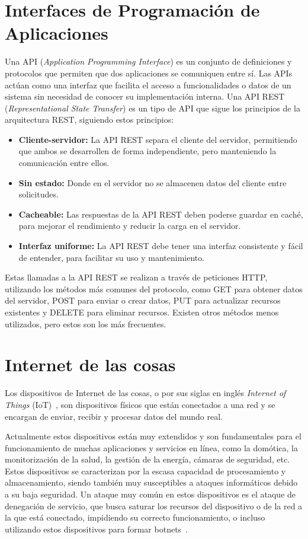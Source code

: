 \section{Interfaces de Programación de Aplicaciones}
Una API (\textit{Application Programming Interface}) es un conjunto de definiciones y protocolos que permiten que dos aplicaciones se comuniquen entre sí. Las APIs~\cite{Api} actúan como una interfaz que facilita el acceso a funcionalidades o datos de un sistema sin necesidad de conocer su implementación interna.
Una API REST (\textit{Representational State Transfer}) es un tipo de API que sigue los principios de la arquitectura REST, siguiendo estos principios:
\begin{itemize}
	\item \textbf{Cliente-servidor:} La API REST separa el cliente del servidor, permitiendo que ambos se desarrollen de forma independiente, pero manteniendo la comunicación entre ellos.
	\item \textbf{Sin estado:} Donde en el servidor no se almacenen datos del cliente entre solicitudes.
	\item \textbf{Cacheable:} Las respuestas de la API REST deben poderse guardar en caché, para mejorar el rendimiento y reducir la carga en el servidor.
	\item \textbf{Interfaz uniforme:} La API REST debe tener una interfaz consistente y fácil de entender, para facilitar su uso y mantenimiento.
\end{itemize}
Estas llamadas a la API REST se realizan a través de peticiones HTTP, utilizando los métodos más comunes del protocolo, como GET para obtener datos del servidor, POST para enviar o crear datos, PUT para actualizar recursos existentes y DELETE para eliminar recursos. Existen otros métodos menos utilizados, pero estos son los más frecuentes.

\section{Internet de las cosas}
Los dispositivos de Internet de las cosas, o por sus siglas en inglés \textit{Internet of Things} (IoT)~\cite{AzizAlKabir2023}, son dispositivos físicos que están conectados a una red y se encargan de enviar, recibir y procesar datos del mundo real. 

Actualmente estos dispositivos están muy extendidos y son fundamentales para el funcionamiento de muchas aplicaciones y servicios en línea, como la domótica, la monitorización de la salud, la gestión de la energía, cámaras de seguridad, etc. Estos dispositivos se caracterizan por la escasa capacidad de procesamiento y almacenamiento, siendo también muy susceptibles a ataques informáticos debido a su baja seguridad. Un ataque muy común en estos dispositivos es el ataque de denegación de servicio, que busca saturar los recursos del dispositivo o de la red a la que está conectado, impidiendo su correcto funcionamiento, o incluso utilizando estos dispositivos para formar botnets~\cite{kolias2017}. 


